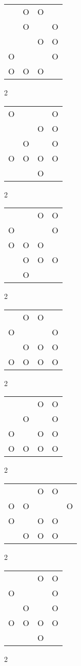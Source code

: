 \begin{tabular}{|m{0.2cm}m{0.2cm}m{0.2cm}m{0.2cm}|}\hline
 &O&O& \\
 &O& &O\\
 & &O&O\\
O& & &O\\
O&O&O& \\
\hline\end{tabular}2
\begin{tabular}{|m{0.2cm}m{0.2cm}m{0.2cm}m{0.2cm}|}\hline
O& & &O\\
 & &O&O\\
 &O& &O\\
O&O&O&O\\
 & &O& \\
\hline\end{tabular}2
\begin{tabular}{|m{0.2cm}m{0.2cm}m{0.2cm}m{0.2cm}|}\hline
 & &O&O\\
O& & &O\\
O&O&O& \\
 &O&O&O\\
 &O& & \\
\hline\end{tabular}2
\begin{tabular}{|m{0.2cm}m{0.2cm}m{0.2cm}m{0.2cm}|}\hline
 &O&O& \\
O& & &O\\
 &O&O&O\\
O&O&O&O\\
\hline\end{tabular}2
\begin{tabular}{|m{0.2cm}m{0.2cm}m{0.2cm}m{0.2cm}|}\hline
 & &O&O\\
 &O& &O\\
O& &O&O\\
O&O&O&O\\
\hline\end{tabular}2
\begin{tabular}{|m{0.2cm}m{0.2cm}m{0.2cm}m{0.2cm}m{0.2cm}|}\hline
 & &O&O& \\
O&O& & &O\\
O& &O&O& \\
 &O&O&O& \\
\hline\end{tabular}2
\begin{tabular}{|m{0.2cm}m{0.2cm}m{0.2cm}m{0.2cm}|}\hline
 & &O&O\\
O& & &O\\
 &O& &O\\
O&O&O&O\\
 & &O& \\
\hline\end{tabular}2
